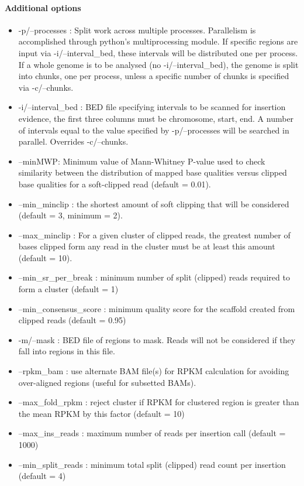 \documentclass[letterpaper,11pt]{article}
\begin{document}
\paragraph{Additional options}
\begin{itemize}
\item -p/--processes :  Split work across multiple processes. Parallelism is accomplished through python's multiprocessing module. If specific regions are input via -i/--interval\_bed, these intervals will be distributed one per process. If a whole genome is to be analysed (no -i/--interval\_bed), the genome is split into chunks, one per process, unless a specific number of chunks is specified via -c/--chunks.
\item -i/--interval\_bed : BED file specifying intervals to be scanned for insertion evidence, the first three columns must be chromosome, start, end. A number of intervals equal to the value specified by -p/--processes will be searched in parallel. Overrides -c/--chunks.
\item --minMWP: Minimum value of Mann-Whitney P-value used to check similarity between the distribution of mapped base qualities versus clipped base qualities for a soft-clipped read (default = 0.01).
\item --min\_minclip : the shortest amount of soft clipping that will be considered (default = 3, minimum = 2).
\item --max\_minclip : For a given cluster of clipped reads, the greatest number of bases clipped form any read in the cluster must be at least this amount (default = 10).
\item --min\_sr\_per\_break : minimum number of split (clipped) reads required to form a cluster (default = 1)
\item --min\_consensus\_score : minimum quality score for the scaffold created from clipped reads (default = 0.95)
\item -m/--mask : BED file of regions to mask. Reads will not be considered if they fall into regions in this file.
\item --rpkm\_bam : use alternate BAM file(s) for RPKM calculation for avoiding over-aligned regions (useful for subsetted BAMs).
\item --max\_fold\_rpkm : reject cluster if RPKM for clustered region is greater than the mean RPKM by this factor (default = 10)
\item --max\_ins\_reads : maximum number of reads per insertion call (default = 1000)
\item --min\_split\_reads : minimum total split (clipped) read count per insertion (default = 4)

\end{itemize}
\end{document}
